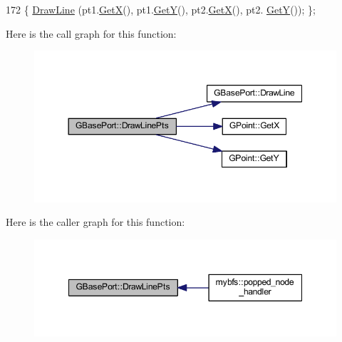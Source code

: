 \begin{DoxyCode}
172         \{ \mbox{\hyperlink{class_g_base_port_a9e19a5d97e629c3d19be31e1938504c1}{DrawLine}} (pt1.\mbox{\hyperlink{class_g_point_a1abafe0e52e3f7039bbe0c0acbb5a9a9}{GetX}}(), pt1.\mbox{\hyperlink{class_g_point_a0b40736448fc178ac2406875bd524a2c}{GetY}}(), pt2.\mbox{\hyperlink{class_g_point_a1abafe0e52e3f7039bbe0c0acbb5a9a9}{GetX}}(), pt2.
      \mbox{\hyperlink{class_g_point_a0b40736448fc178ac2406875bd524a2c}{GetY}}()); \};
\end{DoxyCode}
Here is the call graph for this function\+:
\nopagebreak
\begin{figure}[H]
\begin{center}
\leavevmode
\includegraphics[width=350pt]{class_g_base_port_ad176b1ff88c4c0a29d51869b13a288d2_cgraph}
\end{center}
\end{figure}
Here is the caller graph for this function\+:
\nopagebreak
\begin{figure}[H]
\begin{center}
\leavevmode
\includegraphics[width=348pt]{class_g_base_port_ad176b1ff88c4c0a29d51869b13a288d2_icgraph}
\end{center}
\end{figure}
\mbox{\label{class_g_postscript_port_a2d69a564e11b54ee7d7878ad83b45707}} 
